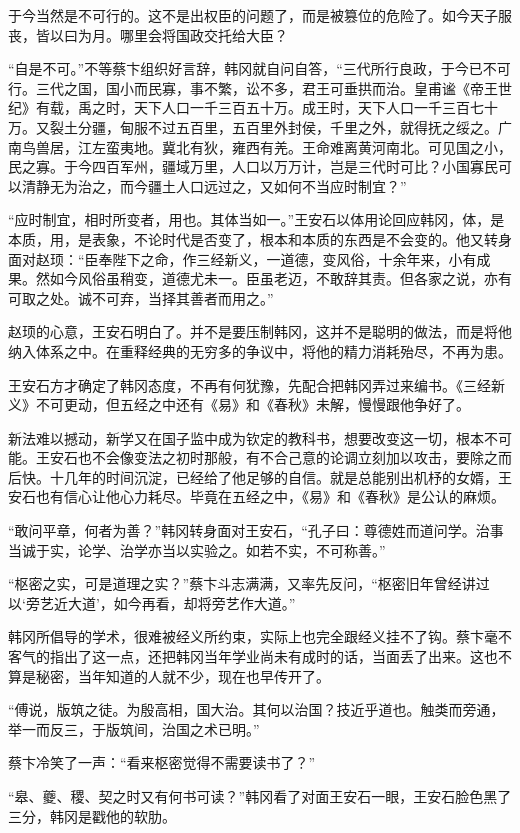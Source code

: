 于今当然是不可行的。这不是出权臣的问题了，而是被篡位的危险了。如今天子服丧，皆以曰为月。哪里会将国政交托给大臣？

“自是不可。”不等蔡卞组织好言辞，韩冈就自问自答，“三代所行良政，于今已不可行。三代之国，国小而民寡，事不繁，讼不多，君王可垂拱而治。皇甫谧《帝王世纪》有载，禹之时，天下人口一千三百五十万。成王时，天下人口一千三百七十万。又裂土分疆，甸服不过五百里，五百里外封侯，千里之外，就得抚之绥之。广南鸟兽居，江左蛮夷地。冀北有狄，雍西有羌。王命难离黄河南北。可见国之小，民之寡。于今四百军州，疆域万里，人口以万万计，岂是三代时可比？小国寡民可以清静无为治之，而今疆土人口远过之，又如何不当应时制宜？”

“应时制宜，相时所变者，用也。其体当如一。”王安石以体用论回应韩冈，体，是本质，用，是表象，不论时代是否变了，根本和本质的东西是不会变的。他又转身面对赵顼：“臣奉陛下之命，作三经新义，一道德，变风俗，十余年来，小有成果。然如今风俗虽稍变，道德尤未一。臣虽老迈，不敢辞其责。但各家之说，亦有可取之处。诚不可弃，当择其善者而用之。”

赵顼的心意，王安石明白了。并不是要压制韩冈，这并不是聪明的做法，而是将他纳入体系之中。在重释经典的无穷多的争议中，将他的精力消耗殆尽，不再为患。

王安石方才确定了韩冈态度，不再有何犹豫，先配合把韩冈弄过来编书。《三经新义》不可更动，但五经之中还有《易》和《春秋》未解，慢慢跟他争好了。

新法难以撼动，新学又在国子监中成为钦定的教科书，想要改变这一切，根本不可能。王安石也不会像变法之初时那般，有不合己意的论调立刻加以攻击，要除之而后快。十几年的时间沉淀，已经给了他足够的自信。就是总能别出机杼的女婿，王安石也有信心让他心力耗尽。毕竟在五经之中，《易》和《春秋》是公认的麻烦。

“敢问平章，何者为善？”韩冈转身面对王安石，“孔子曰：尊德姓而道问学。治事当诚于实，论学、治学亦当以实验之。如若不实，不可称善。”

“枢密之实，可是道理之实？”蔡卞斗志满满，又率先反问，“枢密旧年曾经讲过以‘旁艺近大道’，如今再看，却将旁艺作大道。”

韩冈所倡导的学术，很难被经义所约束，实际上也完全跟经义挂不了钩。蔡卞毫不客气的指出了这一点，还把韩冈当年学业尚未有成时的话，当面丢了出来。这也不算是秘密，当年知道的人就不少，现在也早传开了。

“傅说，版筑之徒。为殷高相，国大治。其何以治国？技近乎道也。触类而旁通，举一而反三，于版筑间，治国之术已明。”

蔡卞冷笑了一声：“看来枢密觉得不需要读书了？”

“皋、夔、稷、契之时又有何书可读？”韩冈看了对面王安石一眼，王安石脸色黑了三分，韩冈是戳他的软肋。

